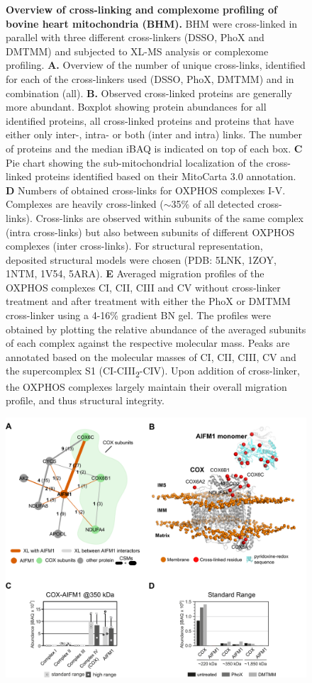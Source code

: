\begin{subappendices}
\begin{figure}[ht!]
		\caption{\textbf{Overview of cross-linking and complexome profiling of bovine heart mitochondria (BHM).} BHM were cross-linked in parallel with three different cross-linkers (DSSO, PhoX and DMTMM) and subjected to XL-MS analysis or complexome profiling. \textbf{A.} Overview of the number of unique cross-links, identified for each of the cross-linkers used (DSSO, PhoX, DMTMM) and in combination (all). \textbf{B.} Observed cross-linked proteins are generally more abundant. Boxplot showing protein abundances for all identified proteins, all cross-linked proteins and proteins that have either only inter-, intra- or both (inter and intra) links. The number of proteins and the median iBAQ is indicated on top of each box. \textbf{C} Pie chart showing the sub-mitochondrial localization of the cross-linked proteins identified based on their MitoCarta 3.0 annotation. \textbf{D} Numbers of obtained cross-links for OXPHOS complexes I-V. Complexes are heavily cross-linked ($\sim$35\% of all detected cross-links). Cross-links are observed within subunits of the same complex (intra cross-links) but also between subunits of different OXPHOS complexes (inter cross-links). For structural representation, deposited structural models were chosen (PDB: 5LNK, 1ZOY, 1NTM, 1V54, 5ARA). \textbf{E} Averaged migration profiles of the OXPHOS complexes CI, CII, CIII and CV without cross-linker treatment and after treatment with either the PhoX or DMTMM cross-linker using a 4-16\% gradient BN gel. The profiles were obtained by plotting the relative abundance of the averaged subunits of each complex against the respective molecular mass. Peaks are annotated based on the molecular masses of CI, CII, CIII, CV and the supercomplex S1 (CI-CIII\textsubscript{2}-CIV). Upon addition of cross-linker, the OXPHOS complexes largely maintain their overall migration profile, and thus structural integrity.}
	\end{figure}
	\begin{figure}[htb]
		\center
		\includegraphics[]{Chapter.3/Figures/SI_Figure2.png}

\end{figure}
\end{subappendices}
